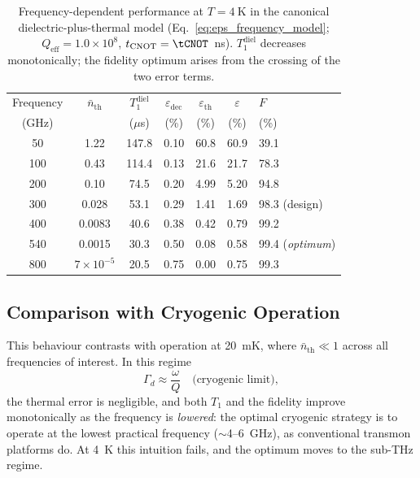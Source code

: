 \begin{table}[h]
\centering
\caption{Frequency-dependent performance at $T = \SI{4}{\kelvin}$ in the
canonical dielectric-plus-thermal model
(Eq.~\eqref{eq:eps_frequency_model}; $Q_{\text{eff}} = 1.0\times10^{8}$,
$t_{\text{CNOT}} = \tCNOT$~ns). $T_1^{\text{diel}}$ decreases monotonically;
the fidelity optimum arises from the crossing of the two error terms.}
\label{tab:frequency_comparison}
\begin{tabular}{ccccccl}
\toprule
Frequency & $\bar{n}_{\text{th}}$ & $T_1^{\text{diel}}$ &
$\varepsilon_{\text{dec}}$ & $\varepsilon_{\text{th}}$ &
$\varepsilon$ & $F$ \\
(GHz) & & ($\mu$s) & (\%) & (\%) & (\%) & (\%) \\
\midrule
50  & 1.22    & 147.8 & 0.10 & 60.8 & 60.9 & 39.1 \\
100 & 0.43    & 114.4 & 0.13 & 21.6 & 21.7 & 78.3 \\
200 & 0.10    & 74.5  & 0.20 & 4.99 & 5.20 & 94.8 \\
300 & 0.028   & 53.1  & 0.29 & 1.41 & 1.69 & 98.3 \; (design) \\
400 & 0.0083  & 40.6  & 0.38 & 0.42 & 0.79 & 99.2 \\
540 & 0.0015  & 30.3  & 0.50 & 0.08 & 0.58 & 99.4 \; (\emph{optimum}) \\
800 & $7\times10^{-5}$ & 20.5 & 0.75 & 0.00 & 0.75 & 99.3 \\
\bottomrule
\end{tabular}
\end{table}

\subsection{Comparison with Cryogenic Operation}

This behaviour contrasts with operation at \SI{20}{\milli\kelvin}, where
$\bar{n}_{\text{th}} \ll 1$ across all frequencies of interest. In this regime
\begin{equation}
\Gamma_d \approx \frac{\omega}{Q} \quad \text{(cryogenic limit)},
\end{equation}
the thermal error is negligible, and both $T_1$ and the fidelity improve
monotonically as the frequency is \emph{lowered}: the optimal cryogenic
strategy is to operate at the lowest practical frequency
($\sim$\SI{4}{}--\SI{6}{\giga\hertz}), as conventional transmon platforms do.
At \SI{4}{\kelvin} this intuition fails, and the optimum moves to the sub-THz
regime.

